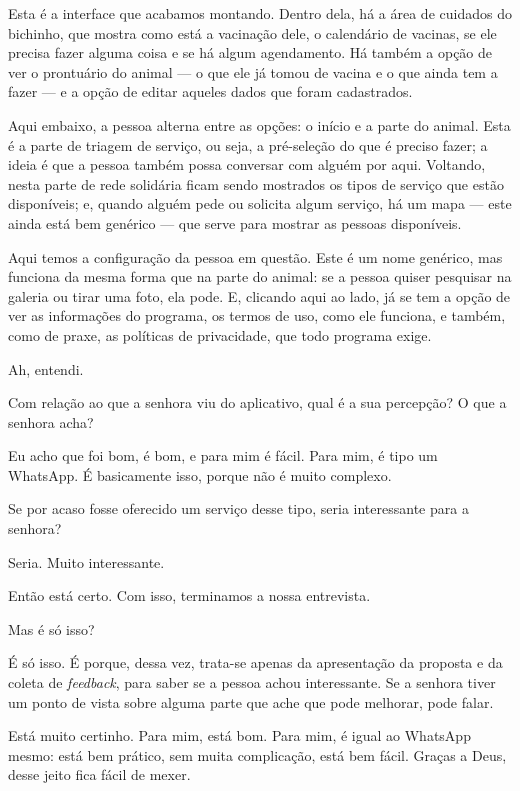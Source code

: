 \documentclass[12pt,a4paper]{article}
\newenvironment{turnos}
  {\begin{list}{}{%
     \setlength{\leftmargin}{2.2cm}%
     \setlength{\labelwidth}{2.0cm}%
     \setlength{\labelsep}{0.2cm}%
     \setlength{\itemsep}{0.6em}%
     \setlength{\parsep}{0pt}}}
  {\end{list}}
\newcommand{\fala}[1]{\item[\textbf{#1}\hfill]}
\begin{document}
\begin{turnos}
\fala{E:} Esta é a interface que acabamos montando. Dentro dela, há a área de cuidados do
bichinho, que mostra como está a vacinação dele, o calendário de vacinas, se ele precisa
fazer alguma coisa e se há algum agendamento. Há também a opção de ver o prontuário do
animal --- o que ele já tomou de vacina e o que ainda tem a fazer --- e a opção de editar
aqueles dados que foram cadastrados.

\fala{E:} Aqui embaixo, a pessoa alterna entre as opções: o início e a parte do animal. Esta
é a parte de triagem de serviço, ou seja, a pré-seleção do que é preciso fazer; a ideia é que
a pessoa também possa conversar com alguém por aqui. Voltando, nesta parte de rede solidária
ficam sendo mostrados os tipos de serviço que estão disponíveis; e, quando alguém pede ou
solicita algum serviço, há um mapa --- este ainda está bem genérico --- que serve para
mostrar as pessoas disponíveis.

\fala{E:} Aqui temos a configuração da pessoa em questão. Este é um nome genérico, mas
funciona da mesma forma que na parte do animal: se a pessoa quiser pesquisar na galeria ou
tirar uma foto, ela pode. E, clicando aqui ao lado, já se tem a opção de ver as informações
do programa, os termos de uso, como ele funciona, e também, como de praxe, as políticas de
privacidade, que todo programa exige.

\fala{P:} Ah, entendi.

\fala{E:} Com relação ao que a senhora viu do aplicativo, qual é a sua percepção? O que a
senhora acha?

\fala{P:} Eu acho que foi bom, é bom, e para mim é fácil. Para mim, é tipo um WhatsApp. É
basicamente isso, porque não é muito complexo.

\fala{E:} Se por acaso fosse oferecido um serviço desse tipo, seria interessante para a
senhora?

\fala{P:} Seria. Muito interessante.

\fala{E:} Então está certo. Com isso, terminamos a nossa entrevista.

\fala{P:} Mas é só isso?

\fala{E:} É só isso. É porque, dessa vez, trata-se apenas da apresentação da proposta e da
coleta de \textit{feedback}, para saber se a pessoa achou interessante. Se a senhora tiver um
ponto de vista sobre alguma parte que ache que pode melhorar, pode falar.

\fala{P:} Está muito certinho. Para mim, está bom. Para mim, é igual ao WhatsApp mesmo: está
bem prático, sem muita complicação, está bem fácil. Graças a Deus, desse jeito fica fácil de
mexer.


\end{turnos}
\end{document}
